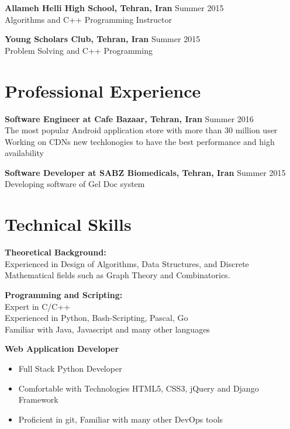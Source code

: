 \documentclass[margin]{res}
\begin{document}
\begin{resume}
    {\bf Allameh Helli High School, Tehran, Iran} \hfill Summer 2015
    \\Algorithms and C++ Programming Instructor
    
    {\bf Young Scholars Club, Tehran, Iran} \hfill Summer 2015
    \\Problem Solving and C++ Programming

\vspace{5mm}


\section{Professional Experience}
    {\bf Software Engineer at Cafe Bazaar, Tehran, Iran} \hfill Summer 2016
    \\The most popular Android application store with more than 30 million user
    \\Working on CDNs new techlonogies to have the best performance and high availability
    
    {\bf Software Developer at SABZ Biomedicals, Tehran, Iran} \hfill Summer 2015
    \\Developing software of Gel Doc system

\vspace{5mm}


\section{Technical Skills} 
    {\bf Theoretical Background:}
    \\Experienced in Design of Algorithms, Data Structures, and Discrete Mathematical fields such as Graph Theory and Combinatorics.

	{\bf Programming and Scripting:}
	\\Expert in C/C++
	\\Experienced in Python, Bash-Scripting, Pascal, Go
	\\Familiar with Java, Javascript and many other languages
	
	{\bf Web Application Developer}
	\begin{itemize}
		\item Full Stack Python Developer
		\item Comfortable with Technologies HTML5, CSS3, jQuery and Django Framework
		\item Proficient in git, Familiar with many other DevOps tools
	\end{itemize}
	

\end{resume}
\end{document}

